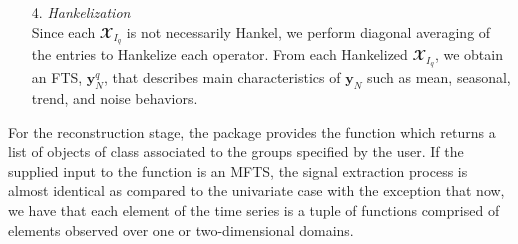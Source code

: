\begin{itemize}
\begin{itemize}
\item[4.] \textit{Hankelization }\\ Since each $\mathbfcal{X}_{I_{q}}$ is not necessarily Hankel, we perform diagonal averaging of the entries to Hankelize each operator. From each Hankelized $\mathbfcal{X}_{I_{q}}$, we obtain an FTS, $\mathbf{y}_{N}^{q}$, that describes main characteristics of $\mathbf{y}_{N}$ such as mean, seasonal, trend, and noise behaviors.
\end{itemize}
For the reconstruction stage, the  package provides the function  which returns a list of objects of class  associated to the groups specified by the user. If the supplied input to the  function is an MFTS, the signal extraction process is almost identical as compared to the univariate case with the exception that now, we have that each element of the time series is a tuple of functions comprised of elements observed over one or two-dimensional domains.%
\end{itemize}
